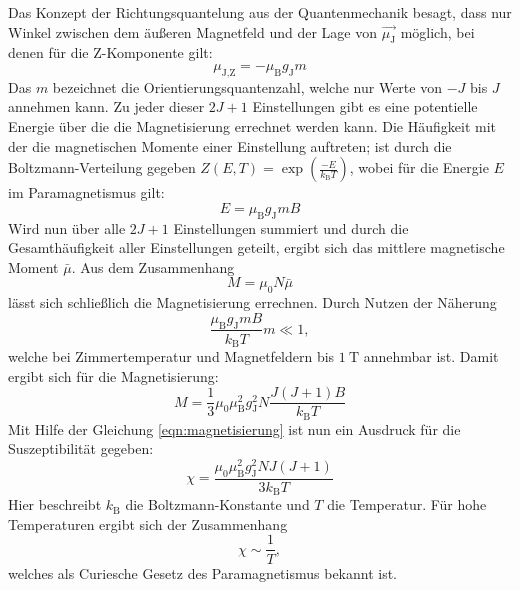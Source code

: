 Das Konzept der Richtungsquantelung aus der Quantenmechanik besagt, dass nur Winkel zwischen dem äußeren Magnetfeld und der Lage von $\vec{\mu_{\text{J}}}$ möglich, bei denen für die Z-Komponente gilt:
\begin{equation*}
    \mu_{\text{J},\text{Z}} = - \mu_{\text{B}} g_{\text{J}} m 
\end{equation*}
Das $m$ bezeichnet die Orientierungsquantenzahl, welche nur Werte von $-J$ bis $J$ annehmen kann. 
Zu jeder dieser $2J+1$ Einstellungen gibt es eine potentielle Energie über die die Magnetisierung errechnet werden kann.
Die Häufigkeit mit der die magnetischen Momente einer Einstellung auftreten; ist durch die Boltzmann-Verteilung gegeben $Z(E,T)= \exp(\frac{-E}{k_{\text{B}} T})$, wobei für die Energie $E$ im Paramagnetismus gilt:
\begin{equation*}
    E = \mu_{\text{B}} g_{\text{J}} m B
\end{equation*}
Wird nun über alle $2J+1$ Einstellungen summiert und durch die Gesamthäufigkeit aller Einstellungen geteilt, ergibt sich das mittlere magnetische Moment $\bar{\mu}$.
Aus dem Zusammenhang
\begin{equation*}
    M = \mu_0 N \bar{\mu}
\end{equation*}
lässt sich schließlich die Magnetisierung errechnen.
Durch Nutzen der Näherung
\begin{equation*}
    \frac{\mu_{\text{B}} g_{\text{J}} m B}{k_{\text{B}} T} m \ll 1,
\end{equation*}
welche bei Zimmertemperatur und Magnetfeldern bis $\SI{1}{\tesla}$ annehmbar ist.
Damit ergibt sich für die Magnetisierung:
\begin{equation*}
    M = \frac{1}{3} \mu_0 \mu_{\text{B}}^2 g_{\text{J}}^2 N \frac{J(J+1)B}{k_{\text{B}} T}
\end{equation*}
Mit Hilfe der Gleichung \eqref{eqn:magnetisierung} ist nun ein Ausdruck für die Suszeptibilität gegeben:
\begin{equation} \label{eqn:sus_theo}
    \chi = \frac{\mu_0 \mu_{\text{B}}^2 g_{\text{J}}^2 N J (J+1)}{3 k_{\text{B}} T}
\end{equation}
Hier beschreibt $k_{\text{B}}$ die Boltzmann-Konstante und $T$ die Temperatur.
Für hohe Temperaturen ergibt sich der Zusammenhang 
\begin{equation*}
    \chi \sim \frac{1}{T},
\end{equation*}
welches als Curiesche Gesetz des Paramagnetismus bekannt ist.\\
\\
